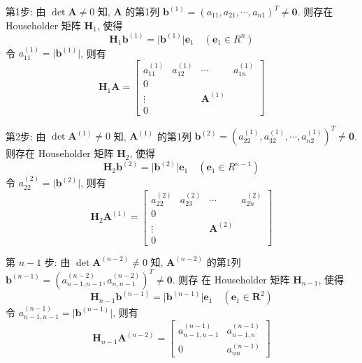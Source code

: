 \par 第1步: 由 $\det \bm{A} \neq 0$ 知, $\bm{A}$ 的第1列 $\bm{b}^{(1)} = (a_{11}, a_{21}, \cdots, a_{n1})^T \neq \bm{0}$. 则存在
Householder 矩阵 $\bm{H}_1$, 使得
$$
    \bm{H}_1\bm{b}^{(1)} = \lvert \bm{b}^{(1)} \rvert \bm{e}_1 \quad (\bm{e}_1 \in R^n)
$$
令 $a_{11}^{(1)} = \lvert \bm{b}^{(1)} \rvert$, 则有
$$
    \bm{H}_1\bm{A} =
    \left [
        \begin{array}{c|ccc}
            a_{11}^{(1)} & a_{12}^{(1)} & \cdots       & a_{1n}^{(1)} \\ \hline
            0            &              &              &              \\
            \vdots       &              & \bm{A}^{(1)} &              \\
            0            &              &              &
        \end{array}
        \right ]
$$
\par 第2步: 由 $\det\bm{A}^{(1)} \neq 0$ 知, $\bm{A}^{(1)}$ 的第1列 $\bm{b}^{(2)} = (a_{22}^{(1)}, a_{32}^{(1)}, \cdots, a_{n2}^{(1)})^T \neq \bm{0}$. 则存在
Householder 矩阵 $\bm{H}_2$, 使得
$$
    \bm{H}_2\bm{b}^{(2)} = \lvert \bm{b}^{(2)} \rvert \bm{e}_1 \quad (\bm{e}_1 \in R^{n-1})
$$
令 $a_{22}^{(2)} = \lvert \bm{b}^{(2)} \rvert$, 则有
$$
    \bm{H}_2\bm{A}^{(1)} =
    \left [
        \begin{array}{c|ccc}
            a_{22}^{(2)} & a_{23}^{(2)} & \cdots       & a_{2n}^{(2)} \\ \hline
            0            &              &              &              \\
            \vdots       &              & \bm{A}^{(2)} &              \\
            0            &              &              &
        \end{array}
        \right ]
$$
\par 第 $n-1$ 步: 由 $\det\bm{A}^{(n-2)} \neq 0$ 知, $\bm{A}^{(n-2)}$ 的第1列 $\bm{b}^{(n-1)} = (a_{n-1,n-1}^{(n-2)}, a_{n, n-1}^{(n-2)})^T \neq \bm{0}$. 则存
在 Householder 矩阵 $\bm{H}_{n-1}$, 使得
$$
    \bm{H}_{n-1} \bm{b}^{(n-1)} = \lvert \bm{b}^{(n-1)} \rvert \bm{e}_1 \quad (\bm{e}_1 \in \bm{R}^2)
$$
令 $a_{n-1,n-1}^{(n-1)} = \lvert \bm{b}^{(n-1)} \rvert$, 则有
$$
    \bm{H}_{n-1}\bm{A}^{(n-2)} = \begin{bmatrix}
        a_{n-1,n-1}^{(n-1)} & a_{n-1,n}^{(n-1)} \\
        0                   & a_{nn}^{(n-1)}
    \end{bmatrix}
$$
